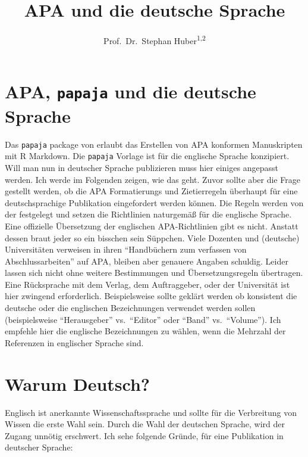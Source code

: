 \documentclass[
  doc,floatsintext]{apa6}
\title{APA und die deutsche Sprache}
\author{Prof.~Dr.~Stephan Huber\textsuperscript{1,2}}
\date{}
\affiliation{\vspace{0.5cm}\textsuperscript{1} Fresenius University of Applied Science\\\textsuperscript{2} Charlotte Fresenius University}
\begin{document}
\maketitle

\hypertarget{apa-papaja-und-die-deutsche-sprache}{%
\section{\texorpdfstring{APA, \texttt{papaja} und die deutsche Sprache}{APA, papaja und die deutsche Sprache}}\label{apa-papaja-und-die-deutsche-sprache}}

Das \texttt{papaja} package von \textcite{R-papaja} erlaubt das Erstellen von APA konformen Manuskripten mit R Markdown. Die \texttt{papaja} Vorlage ist für die englische Sprache konzipiert. Will man nun in deutscher Sprache publizieren muss hier einiges angepasst werden. Ich werde im Folgenden zeigen, wie das geht. Zuvor sollte aber die Frage gestellt werden, ob die APA Formatierungs und Zietierregeln überhaupt für eine deutschsprachige Publikation eingefordert werden können. Die Regeln werden von der \textcite{Association2020Publication} festgelegt und setzen die Richtlinien naturgemäß für die englische Sprache. Eine offizielle Übersetzung der englischen APA-Richtlinien gibt es nicht. Anstatt dessen braut jeder so ein bisschen sein Süppchen. Viele Dozenten und (deutsche) Universitäten verweisen in ihren ``Handbüchern zum verfassen von Abschlussarbeiten'' auf APA, bleiben aber genauere Angaben schuldig. Leider lassen sich nicht ohne weitere Bestimmungen und Übersetzungsregeln übertragen. Eine Rücksprache mit dem Verlag, dem Auftraggeber, oder der Universität ist hier zwingend erforderlich. Beispielsweise sollte geklärt werden ob konsistent die deutsche oder die englischen Bezeichnungen verwendet werden sollen (beispielsweise ``Herausgeber'' vs.~``Editor'' oder ``Band'' vs.~``Volume''). Ich empfehle hier die englische Bezeichnungen zu wählen, wenn die Mehrzahl der Referenzen in englischer Sprache sind.

\hypertarget{warum-deutsch}{%
\section{Warum Deutsch?}\label{warum-deutsch}}

Englisch ist anerkannte Wissenschaftssprache und sollte für die Verbreitung von Wissen die erste Wahl sein. Durch die Wahl der deutschen Sprache, wird der Zugang unnötig erschwert. Ich sehe folgende Gründe, für eine Publikation in deutscher Sprache:
\end{document}

